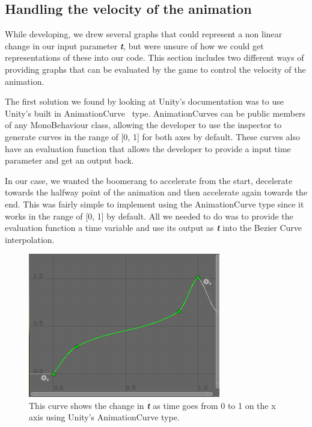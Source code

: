 \subsection{Handling the velocity of the animation}
While developing, we drew several graphs that could represent a non linear change in our input parameter \textbf{\textit{t}}, but were unsure of how we could get representations of these into our code.  This section includes two different ways of providing graphs that can be evaluated by the game to control the velocity of the animation.

The first solution we found by looking at Unity's documentation was to use Unity's built in AnimationCurve~\cite{unityDocumentationAnimationCurve} type. AnimationCurves can be public members of any MonoBehaviour class, allowing the developer to use the inspector to generate curves in the range of [0, 1] for both axes by default. These curves also have an evaluation function that allows the developer to provide a input time parameter and get an output back. 

In our case, we wanted the boomerang to accelerate from the start, decelerate towards the halfway point of the animation and then accelerate again towards the end. This was fairly simple to implement using the AnimationCurve type since it works in the range of [0, 1] by default. All we needed to do was to provide the evaluation function a time variable and use its output as \textbf{\textit{t}} into the Bezier Curve interpolation. 
    
\begin{figure}[tbph]  %
  \centering
  \includegraphics[width=.5\textwidth]{images/BoomerangAnimationCurve}
  \caption[Boomerang animation curve using Unity's built in type]{This curve shows the change in \textbf{\textit{t}} as time goes from 0 to 1 on the x axis using Unity's AnimationCurve type.}
  \label{fig:boomerangcurve0}
\end{figure}

